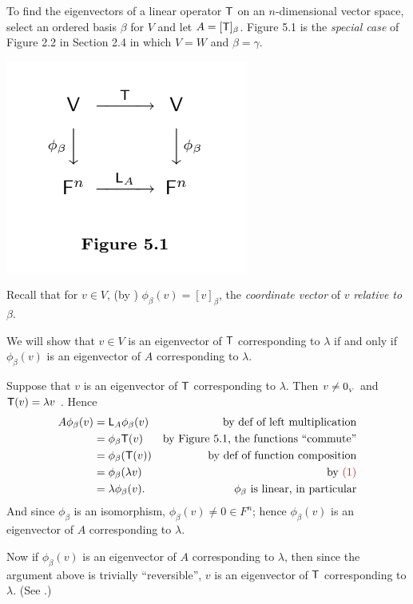 \begin{remark} \label{remark 5.1.9}
To find the eigenvectors of a linear operator \(\textsf{T}\) on an \(n\)-dimensional vector space, select an ordered basis \(\beta\) for \(V\) and let \(A = [\textsf{T}]_{\beta}\).
Figure 5.1 is the \emph{special case} of Figure 2.2 in Section 2.4 in which \(V = W\) and \(\beta = \gamma\).

\includegraphics[width=8cm]{images/figure-5-1.png}

Recall that for \(v \in V\), (by ) \(\phi_{\beta}(v) = [v]_{\beta}\), the \emph{coordinate vector} of \(v\) \emph{relative to} \(\beta\).

We will show that \(v \in V\) is an eigenvector of \(\textsf{T}\) corresponding to \(\lambda\) if and only if \(\phi_{\beta}(v)\) is an eigenvector of \(A\) corresponding to \(\lambda\).

Suppose that \(v\) is an eigenvector of \(\textsf{T}\) corresponding to \(\lambda\).
Then \(v \ne 0_{_V}\) and \(\textsf{T}(v) = \lambda v\) .
Hence
\begin{align*}
    A \phi_{\beta}(v) & = \LMTRAN_A \phi_{\beta} (v) & \text{by def of left multiplication} \\
        & = \phi_{\beta} \T(v) & \text{by Figure 5.1, the functions ``commute''} \\
        & = \phi_{\beta}(\T(v)) & \text{by def of function composition} \\
        & = \phi_{\beta}(\lambda v) & \text{by \MAROON{(1)}} \\
        & = \lambda \phi_{\beta}(v). & \text{\(\phi_{\beta}\) is linear, in particular}
\end{align*}
And since \(\phi_{\beta}\) is an isomorphism, \(\phi_{\beta}(v) \ne 0 \in F^n\);
hence \(\phi_{\beta}(v)\) is an eigenvector of \(A\) corresponding to \(\lambda\).

Now if \(\phi_{\beta}(v)\) is an eigenvector of \(A\) corresponding to \(\lambda\), then since the argument above is trivially ``reversible'', \(v\) is an eigenvector of \(\textsf{T}\)
corresponding to \(\lambda\).
(See .)


\end{remark}
